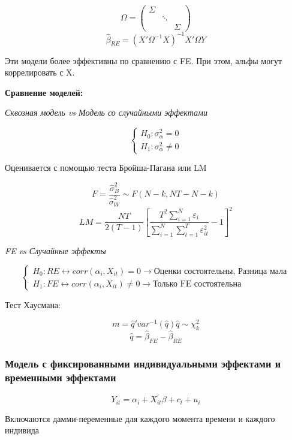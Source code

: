 \documentclass[a4paper, 12pt]{article}
\begin{document}
\[\Omega = \begin{pmatrix}\Sigma & & \\ & \ddots & \\ & & \Sigma\end{pmatrix}\]
\[\hat{\beta}_{RE} = (X'\Omega^{-1}X)^{-1}X'\Omega Y\]

Эти модели более эффективны по сравнению с FE.
При этом, альфы могут коррелировать с X.

\textbf{Сравнение моделей:}

\textit{Сквозная модель vs Модель со случайными эффектами}

\[\begin{cases}
    H_0: \sigma_{\alpha}^2 = 0 \\
    H_1: \sigma_{\alpha}^2 \neq 0
\end{cases}\]

Оценивается с помощью теста Бройша-Пагана или LM

\[F = \frac{\hat{\sigma}_{B}^{2}}{\hat{\sigma}_{W}^{2}} \sim F(N - k, NT - N - k)\]
\[LM = \frac{NT}{2(T - 1)}\left[\frac{T^2\sum_{i = 1}^{N}\varepsilon_{i}}{\sum_{i = 1}^{N}\sum_{t = 1}^{T}\varepsilon_{it}^2} - 1\right]^2\]

\textit{FE vs Случайные эффекты}

\[\begin{cases}
    H_0: RE \leftrightarrow corr(\alpha_i, X_{it}) = 0 \rightarrow \textrm{Оценки состоятельны, Разница мала}\\
    H_1: FE \leftrightarrow corr(\alpha_i, X_{it}) \neq 0 \rightarrow \textrm{Только FE состоятельна}
\end{cases}\]

Тест Хаусмана:

\[m = \hat{q}'var^{-1}(\hat{q})\hat{q} \sim \chi^2_k\]
\[\hat{q} = \hat{\beta}_{FE} - \hat{\beta}_{RE}\]

\subsubsection{Модель с фиксированными индивидуальными эффектами и временными эффектами}

\[Y_{it} = \alpha_i + X_{it}^\prime \beta + c_t + u_i\]

Включаются дамми-переменные для каждого момента времени и
каждого индивида
\end{document}
